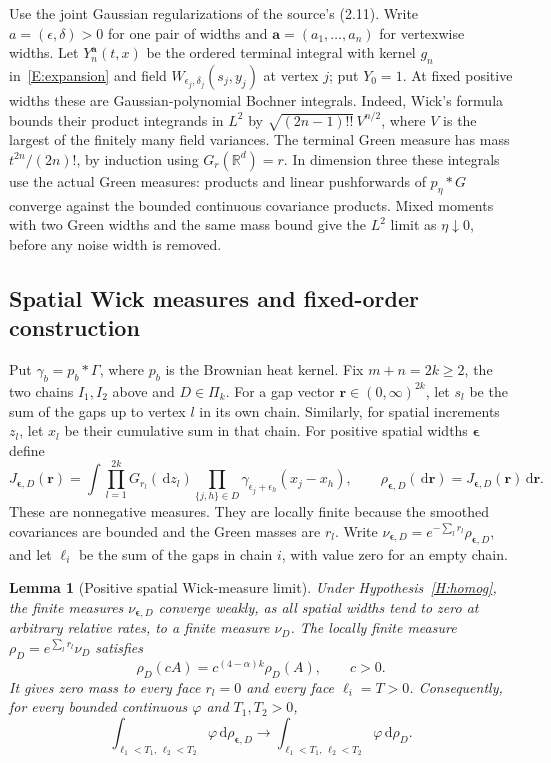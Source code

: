 \documentclass[12pt]{article}
\numberwithin{equation}{section}
\newtheorem{lemma}[theorem]{Lemma}
\theoremstyle{definition}
\newcommand{\R}{\mathbb{R}}
\newcommand{\ud}{\,\mathrm{d}}
\begin{document}
Use the joint Gaussian regularizations of the source's (2.11).
Write $a=(\epsilon,\delta)>0$ for one pair of widths and
$\boldsymbol a=(a_1,\ldots,a_n)$ for vertexwise widths.
Let $Y_n^{\boldsymbol a}(t,x)$ be the ordered terminal integral with
kernel $g_n$ in~\eqref{E:expansion} and field
$W_{\epsilon_j,\delta_j}(s_j,y_j)$ at vertex $j$; put $Y_0=1$.
At fixed positive widths these are Gaussian-polynomial Bochner integrals.
Indeed, Wick's formula bounds their product integrands in $L^2$ by
$\sqrt{(2n-1)!!}\,V^{n/2}$, where $V$ is the largest of the finitely
many field variances. The terminal Green measure has mass
$t^{2n}/(2n)!$, by induction using $G_r(\R^d)=r$.
In dimension three these integrals use the actual Green measures:
products and linear pushforwards of $p_\eta*G$ converge against the
bounded continuous covariance products. Mixed moments with two Green
widths and the same mass bound give the $L^2$ limit as $\eta\downarrow0$,
before any noise width is removed.

\subsection{Spatial Wick measures and fixed-order construction}

Put $\gamma_b=p_b*\Gamma$, where $p_b$ is the Brownian heat kernel.
Fix $m+n=2k\ge2$, the two chains $I_1,I_2$ above and $D\in\Pi_k$.
For a gap vector $\boldsymbol r\in(0,\infty)^{2k}$, let $s_l$ be the
sum of the gaps up to vertex $l$ in its own chain. Similarly, for spatial
increments $z_l$, let $x_l$ be their cumulative sum in that chain.
For positive spatial widths $\boldsymbol\epsilon$ define
\[
  J_{\boldsymbol\epsilon,D}(\boldsymbol r)
  =\int\prod_{l=1}^{2k}G_{r_l}(\ud z_l)
  \prod_{\{j,h\}\in D}
  \gamma_{\epsilon_j+\epsilon_h}(x_j-x_h),\qquad
  \rho_{\boldsymbol\epsilon,D}(\ud\boldsymbol r)
  =J_{\boldsymbol\epsilon,D}(\boldsymbol r)\ud\boldsymbol r.
\]
These are nonnegative measures. They are locally finite because the
smoothed covariances are bounded and the Green masses are $r_l$.
Write $\nu_{\boldsymbol\epsilon,D}=e^{-\sum_l r_l}
\rho_{\boldsymbol\epsilon,D}$, and let $\ell_i$ be the sum of the gaps
in chain $i$, with value zero for an empty chain.

\begin{lemma}[Positive spatial Wick-measure limit]\label{L:spatial-wick-measures}
  Under Hypothesis~\ref{H:homog}, the finite measures
  $\nu_{\boldsymbol\epsilon,D}$ converge weakly, as all spatial widths
  tend to zero at arbitrary relative rates, to a finite measure $\nu_D$.
  The locally finite measure $\rho_D=e^{\sum_l r_l}\nu_D$ satisfies
  \[
    \rho_D(cA)=c^{(4-\alpha)k}\rho_D(A),\qquad c>0.
  \]
  It gives zero mass to every face $r_l=0$ and every face
  $\ell_i=T>0$. Consequently, for every bounded continuous $\varphi$
  and $T_1,T_2>0$,
  \begin{equation}\label{E:spatial-wick-limit}
    \int_{\ell_1<T_1,\,\ell_2<T_2}\varphi\ud\rho_{\boldsymbol\epsilon,D}
    \longrightarrow
    \int_{\ell_1<T_1,\,\ell_2<T_2}\varphi\ud\rho_D.
  \end{equation}
\end{lemma}
\end{document}
